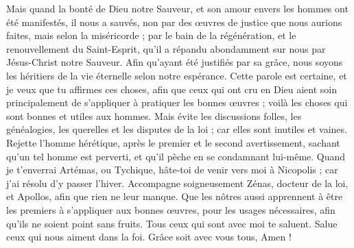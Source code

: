 \begin{multicols}{2}
Mais quand la bonté de Dieu notre Sauveur, et son amour envers les hommes ont été manifestés, il nous a sauvés,
non par des œuvres de justice que nous aurions faites, mais selon la miséricorde ; par le bain de la régénération, et le renouvellement du Saint-Esprit,
qu'il a répandu abondamment sur nous par Jésus-Christ notre Sauveur.
Afin qu'ayant été justifiés par sa grâce, nous soyons les héritiers de la vie éternelle selon notre espérance.
Cette parole est certaine, et je veux que tu affirmes ces choses, afin que ceux qui ont cru en Dieu aient soin principalement de s'appliquer à pratiquer les bonnes œuvres ; voilà les choses qui sont bonnes et utiles aux hommes.
Mais évite les discussions folles, les généalogies, les querelles et les disputes de la loi ; car elles sont inutiles et vaines.
Rejette l'homme hérétique, après le premier et le second avertissement,
sachant qu'un tel homme est perverti, et qu'il pèche en se condamnant lui-même.
Quand je t'enverrai Artémas, ou Tychique, hâte-toi de venir vers moi à Nicopolis ; car j'ai résolu d'y passer l'hiver.
Accompagne soigneusement Zénas, docteur de la loi, et Apollos, afin que rien ne leur manque.
Que les nôtres aussi apprennent à être les premiers à s'appliquer aux bonnes œuvres, pour les usages nécessaires, afin qu'ils ne soient point sans fruits.
Tous ceux qui sont avec moi te saluent. Salue ceux qui nous aiment dans la foi. Grâce soit avec vous tous, Amen !
\PPE{}
\end{multicols}
